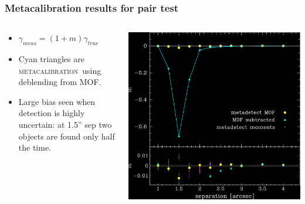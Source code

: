 \documentclass{beamer}
\newcommand{\mcal}{\textsc{metacalibration}}
\begin{document}
\begin{frame}
    \frametitle{Metacalibration results for pair test}

 
    \begin{columns}
        \begin{column}{0.4\textwidth}
            \begin{itemize}

                \item $\gamma_{meas} = (1+m) \gamma_{true}$

                \item Cyan triangles are \mcal\ using deblending from MOF.

                \item Large bias seen when detection is highly uncertain: at 1.5'' sep
                    two objects are found only half the time.

            \end{itemize}
        \end{column}
        \begin{column}{0.6\textwidth}
            \begin{center}
                \includegraphics[width=\columnwidth]{pairs-mc-bdkpair-negate.png}
            \end{center}
        \end{column}
    \end{columns}
\end{frame}
\end{document}

